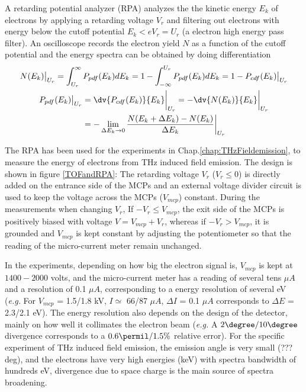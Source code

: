 A retarding potential analyzer (RPA) analyzes the the kinetic energy $E_{k}$ of electrons by applying a retarding voltage $V_{r}$ and filtering out electrons with energy below the cutoff potential $E_{k} < eV_r = U_r$ (a electron high energy pass filter). An oscilloscope records the electron yield $N$ as a function of the cutoff potential and the energy spectra can be obtained by doing differentiation
\begin{equation}
    \begin{gathered}
        N(E_k)\big|_{U_r} = \int_{U_r}^{\infty} P_{pdf}(E_k)dE_k = 1 - \int_{-\infty}^{U_r} P_{pdf}(E_k)dE_k = 1 - P_{cdf}(E_k)\big|_{U_r}\\      
    	\begin{aligned}
    	P_{pdf}(E_k)\big|_{U_r} 
      	&= \dv{P_{cdf}(E_k)}{E_k}\bigg|_{U_r} = -\dv{N(E_k)}{E_k}\bigg|_{U_r}\\
        &= - \lim_{\Delta E_k \to 0} \frac{N(E_k + \Delta E_k) - N(E_k)}{\Delta E_k}\bigg|_{U_r} 
      	\end{aligned}                	
	\end{gathered}
\end{equation}

The RPA has been used for the experiments in Chap.\@ \ref{chap:THzFieldemission}, to measure the energy of electrons from THz induced field emission. The design is shown in figure \ref{TOFandRPA}: The retarding voltage $V_r$ ($V_r \leq 0$) is directly added on the entrance side of the MCPs and an external voltage divider circuit is used to keep the voltage across the MCPs ($V_{mcp}$) constant. During the measurements when changing $V_r$, If $-V_r \leq V_{mcp}$, the exit side of the MCPs is positively biased with voltage $V =V_{mcp} + V_r$, whereas if $-V_r > V_{mcp}$, it is grounded and $V_{mcp}$ is kept constant by adjusting the potentiometer so that the reading of the micro-current meter remain unchanged. 

In the experiments, depending on how big the electron signal is, $V_{mcp}$ is kept at $1400-2000$ volts, and the micro-current meter has a reading of several tens $\mu A$ and a resolution of 0.1 $\mu A$, corresponding to a energy resolution of several eV ({\it e.g.\@} For $V_{mcp}$ = 1.5/1.8 kV, $I \simeq$ 66/87 $\mu A$, $\Delta I$ = 0.1 $\mu A$ corresponds to $\Delta E$ = 2.3/2.1 eV). The energy resolution also depends on the design of the detector, mainly on how well it collimates the electron beam ({\it e.g.\@} A $2\degree/10\degree$ divergence corresponds to a $0.6\permil/1.5\%$ relative error). For the specific experiment of THz induced field emission, the emission angle is very small (???deg), and the electrons have very high energies (keV) with spectra bandwidth of hundreds eV, divergence due to space charge is the main source of spectra broadening.

